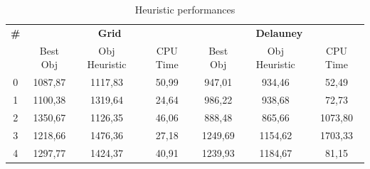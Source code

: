 \renewcommand{\arraystretch}{0.7}
\begin{table}[!h]
\caption{Heuristic performances}
\centering
\footnotesize
\begin{tabular}{c | c c c | c c c}
\hline
\textbf{\#}  & \multicolumn{3}{c}{\textbf{Grid}} &  \multicolumn{3}{c}{\textbf{Delauney}} \\
 &Best Obj & Obj Heuristic &CPU Time &Best Obj & Obj Heuristic & CPU Time \\
\hline
0 &	1087,87	& 1117,83 &	50,99 &	947,01 &	934,46 &	52,49\\
1 &	1100,38	& 1319,64 &	24,64 &	986,22 &	 938,68	& 72,73\\
2 &	1350,67	& 1126,35 &	46,06 &	888,48 &	865,66 &	1073,80\\
3 &	1218,66	& 1476,36 &	27,18 &	1249,69 &	1154,62 &	1703,33\\
4 &	1297,77	& 1424,37 &	40,91 &	1239,93	 & 1184,67 &	81,15\\
    \hline
\end{tabular}
\label{table:tab3}
\end{table}


